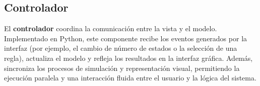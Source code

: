 \subsection{Controlador}

El \textbf{controlador} coordina la comunicación entre la vista y el modelo. Implementado en Python, este componente recibe los eventos generados por la interfaz (por ejemplo, el cambio de número de estados o la selección de una regla), actualiza el modelo y refleja los resultados en la interfaz gráfica. Además, sincroniza los procesos de simulación y representación visual, permitiendo la ejecución paralela y una interacción fluida entre el usuario y la lógica del sistema.

